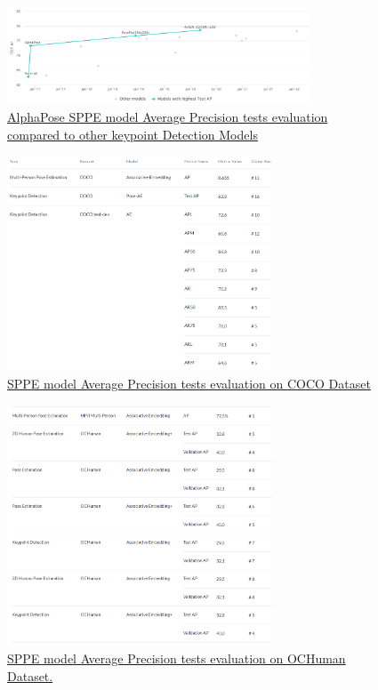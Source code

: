 \pagebreak

\begin{figure}[h]
	\centering
	\includegraphics[width=0.8\textwidth]{figures/Evaluation/SPEEComparison.png}
	\captionsetup{labelformat=empty}
	\caption{\href{https://paperswithcode.com/sota/keypoint-detection-on-coco}
	{AlphaPose SPPE model Average Precision tests evaluation compared to other keypoint Detection Models}}
\end{figure}

\begin{figure}[h]
	\centering
	\includegraphics[width=0.7\textwidth]{figures/Evaluation/EvaluationSPEE1.png}
	\captionsetup{labelformat=empty}
	\caption{\href{https://paperswithcode.com/paper/associative-embedding-end-to-end-learning-for}
	{SPPE model Average Precision tests evaluation on COCO Dataset}}
\end{figure}

\pagebreak

\begin{figure}[h]
	\centering
	\includegraphics[width=0.7\textwidth]{figures/Evaluation/EvaluationSPEE2.png}
	\captionsetup{labelformat=empty}
	\caption{\href{https://paperswithcode.com/paper/associative-embedding-end-to-end-learning-for}
	{SPPE model Average Precision tests evaluation on OCHuman Dataset.}}
\end{figure}



